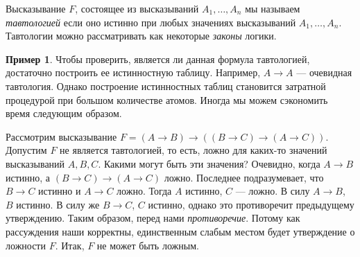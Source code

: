 \documentclass[12pt,notitlepage]{article}
\theoremstyle{plain}
\theoremstyle{definition}
\newtheorem{exm}[thm]{Пример}
\theoremstyle{plain}
\newcommand{\1}{\mathbf{1}}
\newcommand{\0}{\mathbf{0}}
\newcommand{\mcomm}[1]{}
\begin{document}
Высказывание $F$, состоящее из высказываний $A_1,\ldots, A_n$ мы называем \emph{тавтологией} если оно истинно при любых значениях высказываний $A_1,\ldots,A_n$. Тавтологии можно рассматривать как некоторые \emph{законы} логики.
\begin{exm}
	Чтобы проверить, является ли данная формула тавтологией, достаточно построить ее истинностную таблицу. Например, $A \to A$ --- очевидная тавтология. Однако построение истинностных таблиц становится затратной процедурой при большом количестве атомов. Иногда мы можем сэкономить время следующим образом.
	
	Рассмотрим высказывание $F = (A \to B) \to ((B \to C) \to (A \to C))$. Допустим $F$ не является тавтологией, то есть, ложно для каких-то значений высказываний $A, B, C$. Какими могут быть эти значения? Очевидно, когда $A \to B$ истинно, а $(B \to C) \to (A \to C)$ ложно. Последнее подразумевает, что $B \to C$ истинно и $A \to C$ ложно. Тогда $A$ истинно, $C$ --- ложно. В силу $A \to B$, $B$ истинно. В силу же $B \to C$, $C$ истинно, однако это противоречит предыдущему утверждению. Таким образом, перед нами \emph{противоречие}. Потому как рассуждения наши корректны, единственным слабым местом будет утверждение о ложности $F$. Итак, $F$ не может быть ложным.
\end{exm}
\mcomm{}
\end{document}
